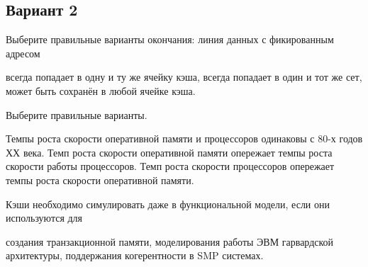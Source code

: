 \subsection*{Вариант 2}
\begin{questions}

\question[3] Выберите правильные варианты окончания: линия данных с фикированным адресом
\begin{choices}
    \choice всегда попадает в одну и ту же ячейку кэша,
    \correctchoice всегда попадает в один и тот же сет,
    \choice может быть сохранён в любой ячейке кэша.
\end{choices}

\question[3] Выберите правильные варианты.
\begin{choices}
    \choice Темпы роста скорости оперативной памяти и процессоров одинаковы с 80-х годов ХХ века.
    \choice Темп роста скорости оперативной памяти опережает темпы роста скорости работы процессоров.
    \correctchoice Темп роста скорости процессоров опережает темпы роста скорости оперативной памяти. 
\end{choices}

\question[3] Кэши необходимо симулировать даже в функциональной модели, если они используются для
\begin{choices}
    \correctchoice создания транзакционной памяти,
    \choice моделирования работы ЭВМ гарвардской архитектуры,
    \choice поддержания когерентности в SMP системах.
\end{choices}





\end{questions}

